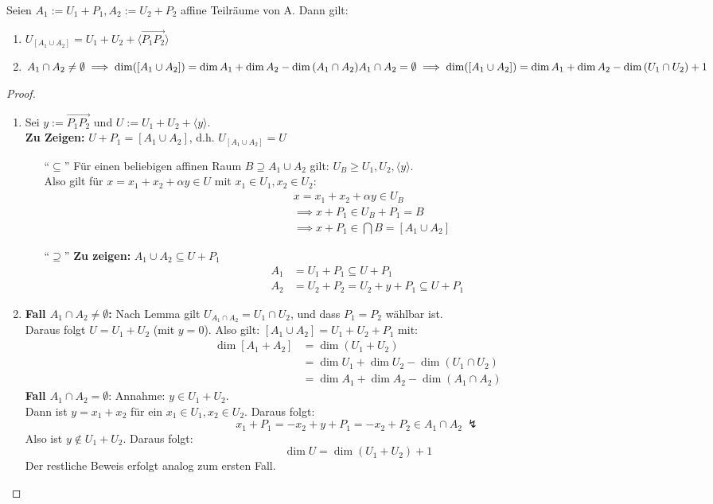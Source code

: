 \documentclass[parskip,a4paper,twoside,DIV15,BCOR12mm]{scrbook}
\begin{document}
\begin{theo}
\label{Satz 20.2}
Seien $A_1:=U_1+P_1,A_2:=U_2+P_2$ affine Teilräume von A. Dann gilt:
\begin{enumerate}
\item $U_{[A_1\cup A_2]}=U_1+U_2+\langle\overrightarrow{P_1P_2}\rangle$
\item $A_1\cap A_2\ne\emptyset \implies \dim([A_1\cup A_2])=\dim{A_1}+\dim{A_2}-\dim{(A_1\cap A_2)}\\
A_1\cap A_2=\emptyset \implies \dim([A_1\cup A_2])=\dim{A_1}+\dim{A_2}-\dim{(U_1\cap U_2)}+1$
\end{enumerate}
\end{theo}

\begin{proof}
\begin{enumerate}
\item Sei $y:=\overrightarrow{P_1P_2}$ und $U:=U_1+U_2+\langle y\rangle$.\\
\textbf{Zu Zeigen:} $U+P_1=[A_1\cup A_2]$, d.h. $U_{[A_1\cup A_2]}=U$
\begin{enumerate}
\item["`$\subseteq$"'] Für einen beliebigen affinen Raum $B\supseteq A_1\cup A_2$ gilt: $U_B\ge U_1,U_2,
\langle y\rangle$.\\
Also gilt für $x=x_1+x_2+\alpha y\in U$ mit $x_1\in U_1, x_2\in U_2$:
\begin{align*}
&x=x_1+x_2+\alpha y\in U_B\\
&\implies x+P_1\in U_B+P_1=B\\
&\implies x+P_1\in \bigcap B=[A_1\cup A_2]
\end{align*}
\item["`$\supseteq$"'] \textbf{Zu zeigen:} $A_1\cup A_2\subseteq U+P_1$\\
\begin{align*}
A_1&=U_1+P_1\subseteq U+P_1\\
A_2&=U_2+P_2=U_2+y+P_1\subseteq U+P_1
\end{align*}
\end{enumerate}
\item 
\textbf{Fall $A_1\cap A_2\ne\emptyset$:} Nach Lemma gilt $U_{A_1\cap A_2}=U_1\cap U_2$,
und dass $P_1=P_2$ wählbar ist.\\ 
Daraus folgt $U=U_1+U_2$ (mit $y=0$). Also gilt: $[A_1\cup A_2]=U_1+U_2+P_1$ mit:
\begin{align*}
\dim{[A_1+A_2]}&=\dim{(U_1+U_2)}\\
&=\dim{U_1}+\dim{U_2}-\dim{(U_1\cap U_2)}\\
&=\dim{A_1}+\dim{A_2}-\dim{(A_1\cap A_2)}
\end{align*}
\textbf{Fall $A_1\cap A_2=\emptyset$}: Annahme: $y\in U_1+U_2$.\\
Dann ist $y=x_1+x_2$ für ein $x_1\in U_1,x_2\in U_2$. Daraus folgt:
\[x_1+P_1 = -x_2+y+P_1=-x_2+P_2\in A_1\cap A_2\ \lightning\]
Also ist $y\notin U_1+U_2$. Daraus folgt:
\[\dim{U}=\dim{(U_1+U_2)}+1\]
Der restliche Beweis erfolgt analog zum ersten Fall.
\end{enumerate}
\end{proof}
\end{document}
